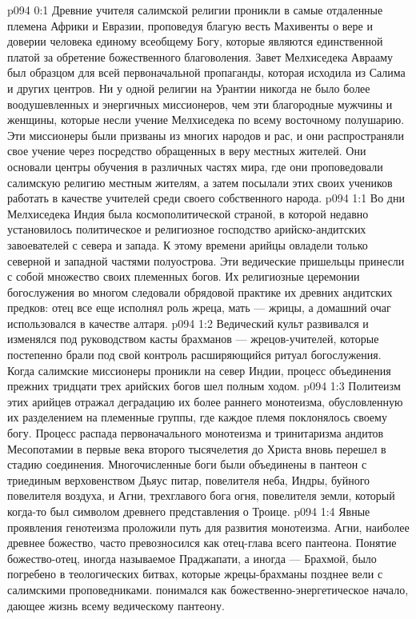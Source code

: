 \author{Мелхиседек}
\vs p094 0:1 Древние учителя салимской религии проникли в самые отдаленные племена Африки и Евразии, проповедуя благую весть Махивенты о вере и доверии человека единому всеобщему Богу, которые являются единственной платой за обретение божественного благоволения. Завет Мелхиседека Аврааму был образцом для всей первоначальной пропаганды, которая исходила из Салима и других центров. Ни у одной религии на Урантии никогда не было более воодушевленных и энергичных миссионеров, чем эти благородные мужчины и женщины, которые несли учение Мелхиседека по всему восточному полушарию. Эти миссионеры были призваны из многих народов и рас, и они распространяли свое учение через посредство обращенных в веру местных жителей. Они основали центры обучения в различных частях мира, где они проповедовали салимскую религию местным жителям, а затем посылали этих своих учеников работать в качестве учителей среди своего собственного народа.
\vs p094 1:1 Во дни Мелхиседека Индия была космополитической страной, в которой недавно установилось политическое и религиозное господство арийско\hyp{}андитских завоевателей с севера и запада. К этому времени арийцы овладели только северной и западной частями полуострова. Эти ведические пришельцы принесли с собой множество своих племенных богов. Их религиозные церемонии богослужения во многом следовали обрядовой практике их древних андитских предков: отец все еще исполнял роль жреца, мать --- жрицы, а домашний очаг использовался в качестве алтаря.
\vs p094 1:2 Ведический культ развивался и изменялся под руководством касты брахманов --- жрецов\hyp{}учителей, которые постепенно брали под свой контроль расширяющийся ритуал богослужения. Когда салимские миссионеры проникли на север Индии, процесс объединения прежних тридцати трех арийских богов шел полным ходом.
\vs p094 1:3 Политеизм этих арийцев отражал деградацию их более раннего монотеизма, обусловленную их разделением на племенные группы, где каждое племя поклонялось своему богу. Процесс распада первоначального монотеизма и тринитаризма андитов Месопотамии в первые века второго тысячелетия до Христа вновь перешел в стадию соединения. Многочисленные боги были объединены в пантеон с триединым верховенством Дьяус питар, повелителя неба, Индры, буйного повелителя воздуха, и Агни, трехглавого бога огня, повелителя земли, который когда\hyp{}то был символом древнего представления о Троице.
\vs p094 1:4 Явные проявления генотеизма проложили путь для развития монотеизма. Агни, наиболее древнее божество, часто превозносился как отец\hyp{}глава всего пантеона. Понятие божество\hyp{}отец, иногда называемое Праджапати, а иногда --- Брахмой, было погребено в теологических битвах, которые жрецы\hyp{}брахманы позднее вели с салимскими проповедниками.  понимался как божественно\hyp{}энергетическое начало, дающее жизнь всему ведическому пантеону.
